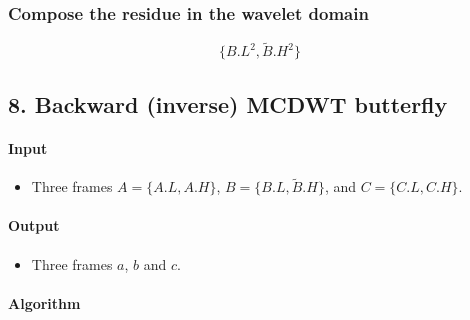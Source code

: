\hypertarget{compose-the-residue-in-the-wavelet-domain}{%
\subsubsection{Compose the residue in the wavelet
domain}\label{compose-the-residue-in-the-wavelet-domain}}

\begin{equation}
   \{B.L^2, \tilde{B}.H^2\}
\end{equation}

    \hypertarget{backward-inverse-mcdwt-butterfly}{%
\subsection{8. Backward (inverse) MCDWT
butterfly}\label{backward-inverse-mcdwt-butterfly}}

\hypertarget{input}{%
\paragraph{Input}\label{input}}

\begin{itemize}
\tightlist
\item
  Three frames \(A=\{A.L, A.H\}\), \(B=\{B.L, \tilde{B}.H\}\), and
  \(C=\{C.L, C.H\}\).
\end{itemize}

\hypertarget{output}{%
\paragraph{Output}\label{output}}

\begin{itemize}
\tightlist
\item
  Three frames \(a\), \(b\) and \(c\).
\end{itemize}

\hypertarget{algorithm}{%
\paragraph{Algorithm}\label{algorithm}}

